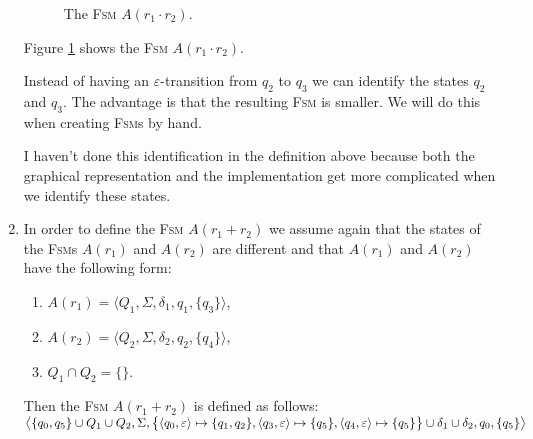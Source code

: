 \begin{enumerate}
      \begin{figure}[!ht]
        \centering
      \caption{The \textsc{Fsm} $A(r_1 \cdot r_2)$.}
      \label{fig:aConcat.eps}
      \end{figure}
      Figure \ref{fig:aConcat.eps} shows the \textsc{Fsm} $A(r_1 \cdot r_2)$.

      Instead of having an $\varepsilon$-transition from $q_2$ to $q_3$ we can identify the states $q_2$ and
      $q_3$.  The advantage is that the resulting \textsc{Fsm} is smaller.
      We will do this when creating \textsc{Fsm}s by hand.  

      I haven't done this identification in the definition above because both the graphical representation and 
      the implementation get more complicated when we identify these states.
\item In order to define the \textsc{Fsm} $A(r_1 + r_2)$ we assume again that the states of the \textsc{Fsm}s
      $A(r_1)$ and $A(r_2)$ are different and that $A(r_1)$ and $A(r_2)$ have the following form:
      \begin{enumerate}
      \item $A(r_1) = \bigl\langle Q_1, \Sigma, \delta_1, q_1, \{ q_3 \}\bigr\rangle$,
      \item $A(r_2) = \bigl\langle Q_2, \Sigma, \delta_2, q_2, \{ q_4 \}\bigr\rangle$,
      \item $Q_1 \cap Q_2 = \{\}$.
      \end{enumerate}
      Then the \textsc{Fsm} $A(r_1 + r_2)$ is defined as follows:
      \\[0.2cm]
      \hspace*{0.8cm}
       $\bigl\langle \{ q_0, q_5 \} \cup Q_1 \cup Q_2, \Sigma, 
                \bigl\{ \pair(q_0,\varepsilon) \mapsto \{q_1, q_2\},
                   \pair(q_3,\varepsilon) \mapsto \{q_5\}, \pair(q_4,\varepsilon) \mapsto \{q_5\} \bigr\} 
                   \cup \delta_1 \cup \delta_2, q_0, \{ q_5 \} \bigr\rangle$


\end{enumerate}
